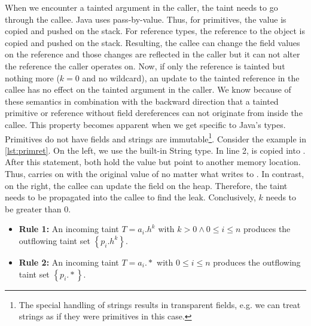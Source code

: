 \documentclass[../draft.tex]{subfiles}
\begin{document}
    When we encounter a tainted argument in the caller, the taint needs to go through the callee.
    Java uses pass-by-value\footnotemark{}.
    Thus, for primitives, the value is copied and pushed on the stack.
    For reference types, the reference to the object is copied and pushed on the stack.
    Resulting, the callee can change the field values on the reference and those changes are reflected in the caller but it can not alter the reference the caller operates on.
    Now, if only the reference is tainted but nothing more ($k=0$ and no wildcard), an update to the tainted reference in the callee has no effect on the tainted argument in the caller.
    We know because of these semantics in combination with the backward direction that a tainted primitive or reference without field dereferences can not originate from inside the callee.
    This property becomes apparent when we get specific to Java's types.
    Primitives do not have fields and strings are immutable\footnote{The special handling of strings results in transparent fields, e.g. we can treat strings as if they were primitives in this case.}.
    Consider the example in \autoref{lst:primret}.
    On the left, we use the built-in String type.
    In line 2,  is copied into .
    After this statement, both  hold the value  but point to another memory location\footnotemark{}.
    Thus,  carries on with the original value of  no matter what  writes to .
    In contrast, on the right, the callee can update the field on the heap.
    Therefore, the taint needs to be propagated into the callee to find the leak.
    Conclusively, $k$ needs to be greater than $0$.
    \begin{itemize}
        \item[] \textbf{Rule 1:} An incoming taint $T=a_i.h^k$ with $k > 0 \land 0 \leq i \leq n$ produces the outflowing taint set $\left\{p_i.h^k\right\}$.
        \item[] \textbf{Rule 2:} An incoming taint $T=a_i.*$ with $0 \leq i \leq n$ produces the outflowing taint set $\left\{p_i.*\right\}$.
    \end{itemize}
\end{document}
